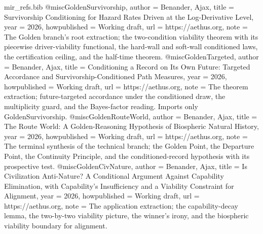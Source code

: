 \begin{filecontents}[overwrite]{mir_refs.bib}
@misc{GoldenSurvivorship,
  author       = {Benander, Ajax},
  title        = {Survivorship Conditioning for Hazard Rates Driven at the Log-Derivative Level},
  year         = {2026},
  howpublished = {Working draft},
  url          = {https://aethus.org},
  note         = {The Golden branch's root extraction; the two-condition viability
                  theorem with its piecewise driver-viability functional, the
                  hard-wall and soft-wall conditioned laws, the certification
                  ceiling, and the half-time theorem.}
}
@misc{GoldenTargeted,
  author       = {Benander, Ajax},
  title        = {Conditioning a Record on Its Own Future: Targeted Accordance and Survivorship-Conditioned Path Measures},
  year         = {2026},
  howpublished = {Working draft},
  url          = {https://aethus.org},
  note         = {The theorem extraction; future-targeted accordance under the
                  conditioned draw, the multiplicity guard, and the Bayes-factor
                  reading. Imports only GoldenSurvivorship.}
}
@misc{GoldenRouteWorld,
  author       = {Benander, Ajax},
  title        = {The Route World: A Golden-Reasoning Hypothesis of Biospheric Natural History},
  year         = {2026},
  howpublished = {Working draft},
  url          = {https://aethus.org},
  note         = {The terminal synthesis of the technical branch; the Golden Point,
                  the Departure Point, the Continuity Principle, and the
                  conditioned-record hypothesis with its prospective test.}
}
@misc{GoldenCivNature,
  author       = {Benander, Ajax},
  title        = {Is Civilization Anti-Nature? A Conditional Argument Against Capability Elimination, with Capability's Insufficiency and a Viability Constraint for Alignment},
  year         = {2026},
  howpublished = {Working draft},
  url          = {https://aethus.org},
  note         = {The application extraction; the capability-decay lemma, the
                  two-by-two viability picture, the winner's irony, and the
                  biospheric viability boundary for alignment.}
}


\end{filecontents}
